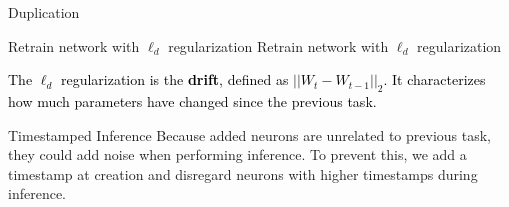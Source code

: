 \documentclass[a0paper,portrait]{baposter}
\begin{document}
\begin{poster}
\begin{posterbox}[name=dup,column=2,below=archi]{Duplication}
\begin{algorithm}[H]
\small
\caption{Neuron Duplication}
\Indm
{}
\Indp
    Retrain network with $\ell_d$ regularization\;
    Retrain network with $\ell_d$ regularization\;
\end{algorithm}
\textcolor{black}{
The $\ell_d$ regularization is the \textbf{drift}, defined as $||W_{t} - W_{t-1}||_2$. It characterizes how much parameters have changed since the previous task. 
}
\end{posterbox}


\begin{posterbox}[name=TE,column=2,below=dup]{Timestamped Inference}
Because added neurons are unrelated to previous task, they could add noise when performing inference. To prevent this, we add a timestamp at creation and disregard neurons with higher timestamps during inference.
\end{posterbox}



\end{poster}
\end{document}
